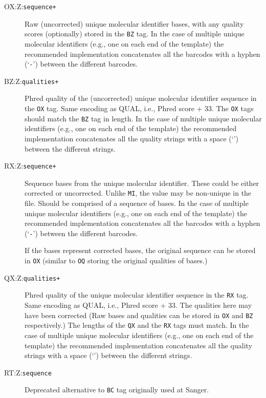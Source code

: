 \documentclass[10pt]{article}
\newcommand{\tagvalue}[1]{\tt #1}
\begin{document}
\begin{description}
\item[OX:Z:\tagvalue{sequence+}] 
Raw (uncorrected) unique molecular identifier bases, with any quality scores (optionally) stored in the {\tt BZ} tag. 
In the case of multiple unique molecular identifiers (e.g., one on each end of the template) the recommended implementation concatenates all the barcodes with a hyphen (`{\tt -}') between the different barcodes.
  
\item[BZ:Z:\tagvalue{qualities+}] 
Phred quality of the (uncorrected) unique molecular identifier sequence in the {\tt OX} tag.
Same encoding as {\sf QUAL}, i.e., Phred score + 33.
The {\tt OX} tags should match the {\tt BZ} tag in length. 
In the case of multiple unique molecular identifiers (e.g., one on each end of the template) the recommended implementation concatenates all the quality strings with a space (`{\tt \textvisiblespace}') between the different strings.

\item[RX:Z:\tagvalue{sequence+}]
Sequence bases from the unique molecular identifier. 
These could be either corrected or uncorrected. Unlike {\tt MI}, the value may be non-unique in the file. 
Should be comprised of a sequence of bases. 
In the case of multiple unique molecular identifiers (e.g., one on each end of the template) the recommended implementation concatenates all the barcodes with a hyphen (`{\tt -}') between the different barcodes.

If the bases represent corrected bases, the original sequence can be stored in {\tt OX} (similar to {\tt OQ} storing the original qualities of bases.)

\item[QX:Z:\tagvalue{qualities+}] 
Phred quality of the unique molecular identifier sequence in the {\tt RX} tag. 
Same encoding as {\sf QUAL}, i.e., Phred score + 33.
The qualities here may have been corrected (Raw bases and qualities can be stored in {\tt OX} and {\tt BZ} respectively.)
The lengths of the {\tt QX} and the {\tt RX} tags must match. 
In the case of multiple unique molecular identifiers (e.g., one on each end of the template) the recommended implementation concatenates all the quality strings with a space (`{\tt \textvisiblespace}') between the different strings.

\item[RT:Z:\tagvalue{sequence}]
  Deprecated alternative to {\tt BC} tag originally used at Sanger.

\end{description}
\end{document}
